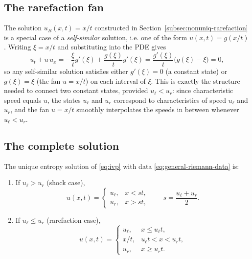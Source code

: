 \subsection{The rarefaction fan}
\label{subsec:rarefaction-general}

The solution $u_B(x,t)=x/t$ constructed in
Section~\ref{subsec:nonuniq-rarefaction} is a special case of a
\emph{self-similar} solution, i.e. one of the form $u(x,t)=g(x/t)$.
Writing $\xi = x/t$ and substituting into the PDE gives
\begin{equation}
  u_t + u\,u_x = -\frac{\xi}{t}g'(\xi) + \frac{g(\xi)}{t}g'(\xi)
  = \frac{g'(\xi)}{t}\big(g(\xi)-\xi\big) = 0,
\end{equation}
so any self-similar solution satisfies either $g'(\xi)=0$ (a constant
state) or $g(\xi)=\xi$ (the fan $u=x/t$) on each interval of $\xi$. This
is exactly the structure needed to connect two constant states, provided
$u_\ell < u_r$: since characteristic speed equals $u$, the states
$u_\ell$ and $u_r$ correspond to characteristics of speed $u_\ell$ and
$u_r$, and the fan $u=x/t$ smoothly interpolates the speeds in between
whenever $u_\ell<u_r$.

\subsection{The complete solution}
\label{subsec:riemann-complete}

\begin{theorem}
\label{thm:riemann-solution}
The unique entropy solution of \eqref{eq:ivp} with data
\eqref{eq:general-riemann-data} is:
\begin{enumerate}
  \item[\textup{(a)}] If $u_\ell > u_r$ (shock case),
  \begin{equation}
    \label{eq:riemann-shock}
    u(x,t) = \begin{cases} u_\ell, & x < st, \\ u_r, & x > st, \end{cases}
    \qquad s = \frac{u_\ell+u_r}{2}.
  \end{equation}
  \item[\textup{(b)}] If $u_\ell \leq u_r$ (rarefaction case),
  \begin{equation}
    \label{eq:riemann-rarefaction}
    u(x,t) = \begin{cases}
      u_\ell, & x \le u_\ell t, \\
      x/t, & u_\ell t < x < u_r t, \\
      u_r, & x \ge u_r t.
    \end{cases}
  \end{equation}
\end{enumerate}
\end{theorem}

